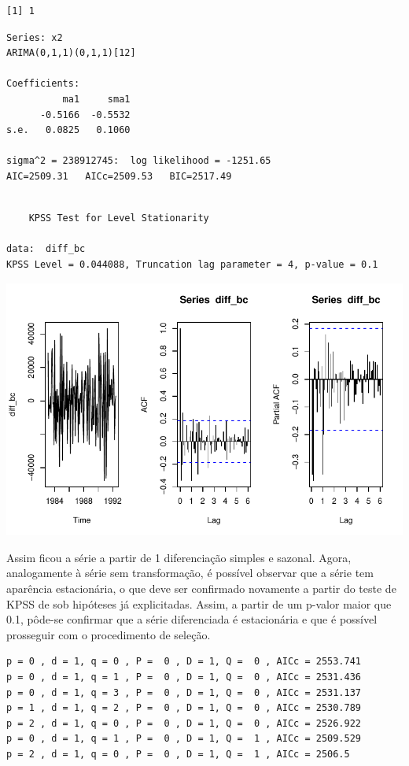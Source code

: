 \documentclass[
  letterpaper,
  DIV=11,
  numbers=noendperiod]{scrartcl}
\begin{document}
\begin{verbatim}
[1] 1
\end{verbatim}

\begin{verbatim}
Series: x2 
ARIMA(0,1,1)(0,1,1)[12] 

Coefficients:
          ma1     sma1
      -0.5166  -0.5532
s.e.   0.0825   0.1060

sigma^2 = 238912745:  log likelihood = -1251.65
AIC=2509.31   AICc=2509.53   BIC=2517.49
\end{verbatim}

\begin{verbatim}

    KPSS Test for Level Stationarity

data:  diff_bc
KPSS Level = 0.044088, Truncation lag parameter = 4, p-value = 0.1
\end{verbatim}

\includegraphics{T2_grupo10_files/figure-pdf/unnamed-chunk-5-1.pdf}

Assim ficou a série a partir de 1 diferenciação simples e sazonal.
Agora, analogamente à série sem transformação, é possível observar que a
série tem aparência estacionária, o que deve ser confirmado novamente a
partir do teste de KPSS de sob hipóteses já explicitadas. Assim, a
partir de um p-valor maior que 0.1, pôde-se confirmar que a série
diferenciada é estacionária e que é possível prosseguir com o
procedimento de seleção.

\begin{verbatim}
p = 0 , d = 1, q = 0 , P =  0 , D = 1, Q =  0 , AICc = 2553.741 
p = 0 , d = 1, q = 1 , P =  0 , D = 1, Q =  0 , AICc = 2531.436 
p = 0 , d = 1, q = 3 , P =  0 , D = 1, Q =  0 , AICc = 2531.137 
p = 1 , d = 1, q = 2 , P =  0 , D = 1, Q =  0 , AICc = 2530.789 
p = 2 , d = 1, q = 0 , P =  0 , D = 1, Q =  0 , AICc = 2526.922 
p = 0 , d = 1, q = 1 , P =  0 , D = 1, Q =  1 , AICc = 2509.529 
p = 2 , d = 1, q = 0 , P =  0 , D = 1, Q =  1 , AICc = 2506.5 
\end{verbatim}
\end{document}
